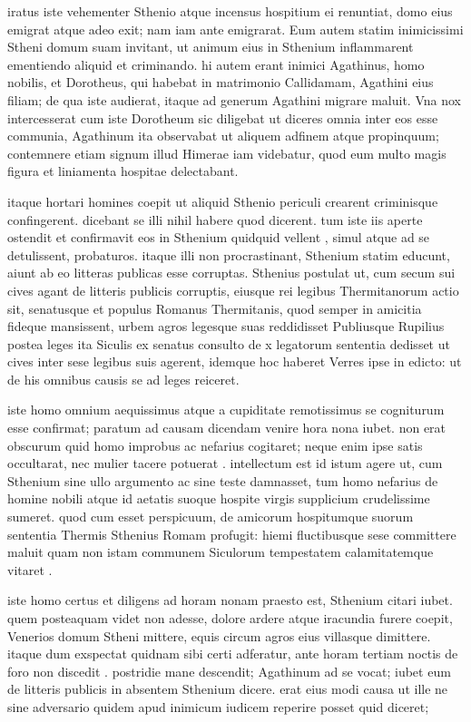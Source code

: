  iratus iste vehementer Sthenio atque incensus hospitium ei renuntiat, domo eius emigrat atque adeo exit; nam iam ante emigrarat. Eum autem statim inimicissimi Stheni domum suam invitant, ut animum eius in Sthenium inflammarent ementiendo aliquid et criminando. hi autem erant inimici Agathinus, homo nobilis, et Dorotheus, qui habebat in matrimonio Callidamam, Agathini eius filiam; de qua iste audierat, itaque ad generum Agathini migrare maluit. Vna nox intercesserat cum iste Dorotheum sic diligebat ut diceres omnia inter eos esse communia, Agathinum ita observabat ut aliquem adfinem atque propinquum; contemnere etiam signum illud Himerae iam videbatur, quod eum multo magis figura et liniamenta hospitae delectabant.

 itaque hortari homines coepit ut aliquid Sthenio periculi crearent criminisque confingerent. dicebant se illi nihil habere quod dicerent. tum iste iis aperte ostendit et confirmavit eos in Sthenium quidquid vellent , simul atque ad se detulissent, probaturos. itaque illi non procrastinant, Sthenium statim educunt, aiunt ab eo litteras publicas esse corruptas. Sthenius postulat ut, cum secum sui cives agant de litteris publicis corruptis, eiusque rei legibus Thermitanorum actio sit, senatusque et populus Romanus Thermitanis, quod semper in amicitia fideque mansissent, urbem agros legesque suas reddidisset Publiusque Rupilius postea leges ita Siculis ex senatus consulto de x legatorum sententia dedisset ut cives inter sese legibus suis agerent, idemque hoc haberet Verres ipse in edicto: ut de his omnibus causis se ad leges reiceret.

 iste homo omnium aequissimus atque a cupiditate remotissimus se cogniturum esse confirmat; paratum ad causam dicendam venire hora nona iubet. non erat obscurum quid homo improbus ac nefarius cogitaret; neque enim ipse satis occultarat, nec mulier tacere potuerat . intellectum est id istum agere ut, cum Sthenium sine ullo argumento ac sine teste damnasset, tum homo nefarius de homine nobili atque id aetatis suoque hospite virgis supplicium crudelissime sumeret. quod cum esset perspicuum, de amicorum hospitumque suorum sententia Thermis Sthenius Romam profugit: hiemi fluctibusque sese committere maluit quam non istam communem Siculorum tempestatem calamitatemque vitaret .

 iste homo certus et diligens ad horam nonam praesto est, Sthenium citari iubet. quem posteaquam videt non adesse, dolore ardere atque iracundia furere coepit, Venerios domum Stheni mittere, equis circum agros eius villasque dimittere. itaque dum exspectat quidnam sibi certi adferatur, ante horam tertiam noctis de foro non discedit . postridie mane descendit; Agathinum ad se vocat; iubet eum de litteris publicis in absentem Sthenium dicere. erat eius modi causa ut ille ne sine adversario quidem apud inimicum iudicem reperire posset quid diceret;


